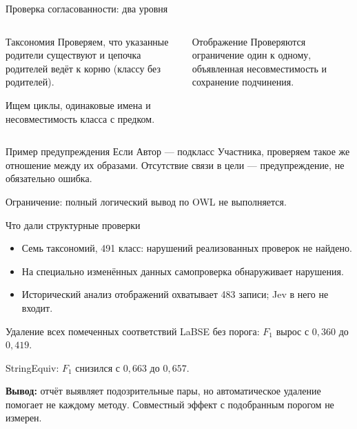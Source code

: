 \documentclass[aspectratio=169,11pt]{beamer}
\begin{document}
\renewcommand{\hseheadertext}{Часть II. Проверка согласованности}
\begin{frame}{Проверка согласованности: два уровня}
  \begin{columns}[T,onlytextwidth]
      \begin{block}{Таксономия}
        Проверяем, что указанные родители существуют и цепочка родителей
        ведёт к корню (классу без родителей).\par
        Ищем циклы, одинаковые имена и несовместимость класса с предком.
      \end{block}
      \begin{block}{Отображение}
        Проверяются ограничение один к одному, объявленная несовместимость
        и сохранение подчинения.
      \end{block}
  \end{columns}
  \begin{exampleblock}{Пример предупреждения}
    Если Автор --- подкласс Участника, проверяем такое же отношение
    между их образами. Отсутствие связи в цели — предупреждение,
    не обязательно ошибка.
  \end{exampleblock}
  \alert{Ограничение: полный логический вывод по OWL не выполняется.}
\end{frame}

\renewcommand{\hseheadertext}{Часть II. Проверка согласованности}
\begin{frame}{Что дали структурные проверки}
  \begin{itemize}
    \item Семь таксономий, 491 класс: нарушений реализованных проверок не найдено.
    \item На специально изменённых данных самопроверка обнаруживает нарушения.
    \item Исторический анализ отображений охватывает 483 записи; Jev в него не входит.
  \end{itemize}
  \begin{block}{Удаление всех помеченных соответствий}
    LaBSE без порога: $F_1$ вырос с $0{,}360$ до $0{,}419$.\par
    StringEquiv: $F_1$ снизился с $0{,}663$ до $0{,}657$.
  \end{block}
  \textbf{Вывод:} отчёт выявляет подозрительные пары, но автоматическое удаление
  помогает не каждому методу. Совместный эффект с подобранным порогом не измерен.
\end{frame}
\end{document}
